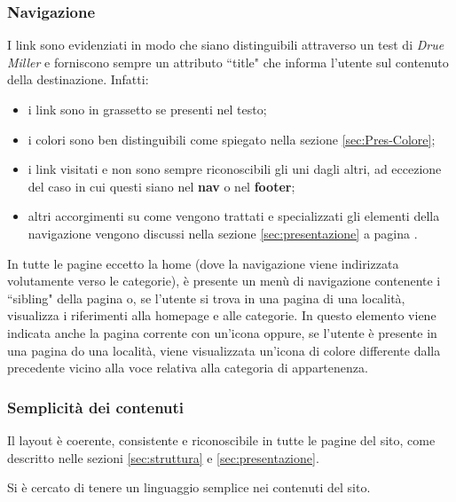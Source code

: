\subsubsection{Navigazione}
I link sono evidenziati in modo che siano distinguibili attraverso un test di \textit{Drue Miller} e forniscono sempre un attributo ``title" che informa
l'utente sul contenuto della destinazione.
Infatti:
\begin{itemize}
\item i link sono in grassetto se presenti nel testo;
\item i colori sono ben distinguibili come spiegato nella sezione \ref{sec:Pres-Colore};
\item i link visitati e non sono sempre riconoscibili gli uni dagli altri, ad
eccezione del caso in cui questi siano nel \textbf{nav} o nel \textbf{footer};
\item altri accorgimenti su come vengono trattati e specializzati gli elementi
della navigazione vengono discussi nella sezione \ref{sec:presentazione} a pagina \pageref{sec:presentazione}.
\end{itemize}

In tutte le pagine eccetto la home (dove la navigazione viene indirizzata
volutamente verso le categorie), è presente un menù di navigazione contenente
i ``sibling" della pagina o, se l'utente si trova in una pagina di una
località, visualizza i riferimenti alla homepage e alle categorie.
In questo elemento viene indicata anche la pagina corrente con un'icona
oppure, se l'utente è presente in una pagina do una località, viene
visualizzata un'icona di colore differente dalla precedente vicino alla
voce relativa alla categoria di appartenenza.

\subsubsection{Semplicità dei contenuti}
Il layout è coerente, consistente e riconoscibile in tutte le pagine del sito,
come descritto nelle sezioni \ref{sec:struttura} e \ref{sec:presentazione}.

Si è cercato di tenere un linguaggio semplice nei contenuti del sito.
